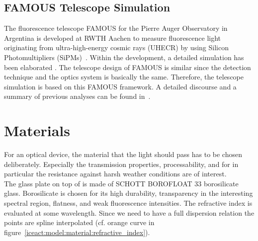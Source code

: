 \subsection{FAMOUS Telescope Simulation}\label{sec:famous_simulation}
The fluorescence telescope FAMOUS for the Pierre Auger Observatory in Argentina is developed at RWTH Aachen to measure fluorescence light originating from ultra-high-energy cosmic rays (UHECR) by using Silicon Photomultipliers (SiPMs)~\cite{famous:bretz}. Within the development, a detailed \geant simulation has been elaborated \cite{famous:sim_github,famous:sim_github}. The telescope design of FAMOUS is similar since the detection technique and the optics system is basically the same. Therefore, the \iceact telescope simulation is based on this FAMOUS \geant framework. A detailed discourse and a summary of previous analyses can be found in~\cite{famous:niggemann}.

\section{Materials}\label{sec:iceact:model:material}

For an optical device, the material that the light should pass has to be chosen deliberately. Especially the transmission properties, processability, and for \iceact in particular the resistance against harsh weather conditions are of interest.\\

The glass plate on top of \iceact is made of SCHOTT BOROFLOAT\textsuperscript{\textregistered} 33 borosilicate glass. Borosilicate is chosen for its high durability, transparency in the interesting spectral region, flatness, and weak fluorescence intensities. The refractive index is evaluated at some wavelength. Since we need to have a full dispersion relation the points are spline interpolated (cf. orange curve in figure~\ref{iceact:model:material:refractive_index}).~\cite{iceact:borosilicate:datasheet}

